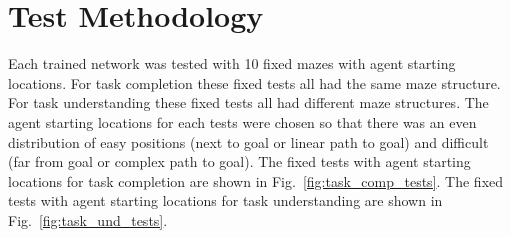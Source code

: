\documentclass[12pt,american]{report}
\providecommand{\DIFaddtex}[1]{{\protect\color{blue}\uwave{#1}}} %
\providecommand{\DIFaddbegin}{} %
\providecommand{\DIFaddend}{} %
\providecommand{\DIFadd}[1]{\texorpdfstring{\DIFaddtex{#1}}{#1}} %
\newcommand{\DIFaddincludegraphics}[2][]{{\color{blue}\fbox{\DIFOincludegraphics[#1]{#2}}}} %
\DeclareRobustCommand{\DIFaddbegin}{\DIFOaddbegin \let\includegraphics\DIFaddincludegraphics} %
\DeclareRobustCommand{\DIFaddend}{\DIFOaddend \let\includegraphics\DIFOincludegraphics} %
\begin{document}
\section{Test Methodology}
Each trained network was tested with \DIFaddbegin \DIFadd{the same }\DIFaddend 10 fixed mazes with \DIFaddbegin \DIFadd{fixed }\DIFaddend agent starting locations.  For task completion these fixed tests all had the same maze structure. For task understanding these fixed tests all had different maze structures. The agent starting locations for each tests were chosen so that there was an even distribution of easy positions (next to goal or linear path to goal) and difficult (far from goal or complex path to goal). The fixed tests with agent starting locations for task completion are shown in Fig.~\ref{fig:task_comp_tests}. The fixed tests with agent starting locations for task understanding are shown in Fig.~\ref{fig:task_und_tests}.
\end{document}
